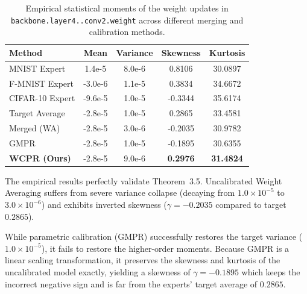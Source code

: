 \documentclass{article}
\theoremstyle{plain}
\theoremstyle{definition}
\theoremstyle{remark}
\begin{document}
\begin{table}[h]
  \caption{Empirical statistical moments of the weight updates in \texttt{backbone.\allowbreak layer4..\allowbreak conv2.\allowbreak weight} across different merging and calibration methods.}
  \label{tab:moments}
  \vskip 0.15in
  \begin{center}
    \begin{small}
      \begin{sc}
        \setlength{\tabcolsep}{2pt}
        \begin{tabular}{lcccc}
          \toprule
          Method & Mean & Variance & Skewness & Kurtosis \\
          \midrule
          MNIST Expert & 1.4e-5 & 8.0e-6 & 0.8106 & 30.0897 \\
          F-MNIST Expert & -3.0e-6 & 1.1e-5 & 0.3834 & 34.6672 \\
          CIFAR-10 Expert & -9.6e-5 & 1.0e-5 & -0.3344 & 35.6174 \\
          \midrule
          Target Average & -2.8e-5 & 1.0e-5 & 0.2865 & 33.4581 \\
          Merged (WA) & -2.8e-5 & 3.0e-6 & -0.2035 & 30.9782 \\
          GMPR & -2.8e-5 & 1.0e-5 & -0.1895 & 30.6355 \\
          \textbf{WCPR (Ours)} & -2.8e-5 & 9.0e-6 & \textbf{0.2976} & \textbf{31.4824} \\
          \bottomrule
        \end{tabular}
      \end{sc}
    \end{small}
  \end{center}
  \vskip -0.1in
\end{table}

The empirical results perfectly validate Theorem~3.5. Uncalibrated Weight Averaging suffers from severe variance collapse (decaying from $1.0 \times 10^{-5}$ to $3.0 \times 10^{-6}$) and exhibits inverted skewness ($\gamma = -0.2035$ compared to target $0.2865$).

While parametric calibration (GMPR) successfully restores the target variance ($1.0 \times 10^{-5}$), it fails to restore the higher-order moments. Because GMPR is a linear scaling transformation, it preserves the skewness and kurtosis of the uncalibrated model exactly, yielding a skewness of $\gamma = -0.1895$ which keeps the incorrect negative sign and is far from the experts' target average of $0.2865$. 
\end{document}

